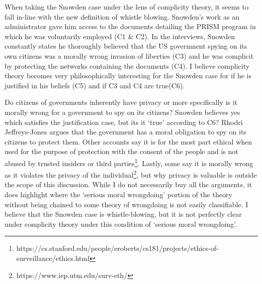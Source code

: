 \documentclass[12pt]{article}
\begin{document}
When taking the Snowden case under the lens of complicity theory, it seems to
fall in-line with the new definition of whistle blowing. Snowden's work as an
administrator gave him access to the documents detailing the PRISM program in
which he was voluntarily employed (C1 \& C2). In the interviews, Snowden
constantly states he thoroughly believed that the US government spying on its
own citizens was a morally wrong invasion of liberties (C3) and he was complicit
by protecting the networks containing the documents (C4). I believe complicity
theory becomes very philosophically interesting for the Snowden case for if he
is justified in his beliefs (C5) and if C3 and C4 are true(C6).

Do citizens of governments inherently have privacy or more specifically is it
morally wrong for a government to spy on its citizens? Snowden believes yes
which satisfies the justification case, but its it `true' according to C6?
Rhodri Jeffreys-Jones argues that the government has a moral obligation to spy
on its citizens to protect them. Other accounts say it is for the most part
ethical when used for the purpose of protection with the consent of the people
and is not abused by trusted insiders or third
parties\footnote{https://cs.stanford.edu/people/eroberts/cs181/projects/ethics-of-surveillance/ethics.html}.
Lastly, some say it is morally wrong as it violates the privacy of the
individual\footnote{https://www.iep.utm.edu/surv-eth/}, but why privacy is
valuable is outside the scope of this discussion. While I do not necessarily buy
all the arguments, it does highlight where the `serious moral wrongdoing'
portion of the theory without being chained to some theory of wrongdoing is not
easily classifiable. I believe that the Snowden case is whistle-blowing, but it
is not perfectly clear under complicity theory under this condition of `serious
moral wrongdoing'.
\end{document}
